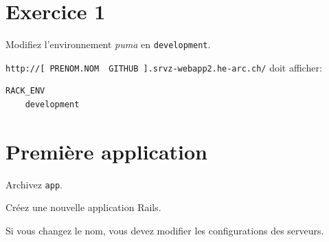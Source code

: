 \hypertarget{exercice-1}{%
\section{Exercice 1}\label{exercice-1}}

Modifiez l'environnement \emph{puma} en
\textenglish{\texttt{development}}.

\textenglish{\texttt{http://{[}\ PRENOM.NOM\ \textbar{}\ GITHUB\ {]}.srvz-webapp2.he-arc.ch/}}
doit afficher:

\begin{english}

\begin{verbatim}
RACK_ENV
    development
\end{verbatim}

\end{english}

\hypertarget{premiuxe8re-application}{%
\section{Première application}\label{premiuxe8re-application}}

Archivez \textenglish{\texttt{app}}.

\begin{english}

\begin{Shaded}
\begin{Highlighting}[]
\NormalTok{$ }
\NormalTok{$ }
\end{Highlighting}
\end{Shaded}

\end{english}

Créez une nouvelle application Rails.

\begin{english}

\begin{Shaded}
\begin{Highlighting}[]
\NormalTok{$ }
\NormalTok{$ }
\end{Highlighting}
\end{Shaded}

\end{english}

Si vous changez le nom, vous devez modifier les configurations des
serveurs.

